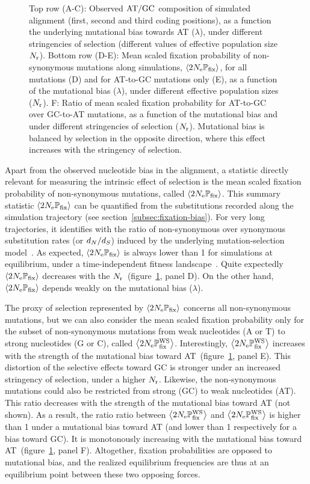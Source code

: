 \documentclass{article}
\begin{document}
\begin{figure}[h]
{  Top row (A-C): Observed $\text{AT/GC}$ composition of simulated alignment (first, second and third coding positions), as a function the underlying mutational bias towards AT ($\lambda$), under different stringencies of selection (different values of effective population size $N_{\text{r}}$).
  Bottom row (D-E): Mean scaled fixation probability of non-synonymous mutations along simulations, $\left\langle 2 N_{\text{e}} \mathbb{P}_{\text{fix}} \right\rangle$, for all mutations (D) and for AT-to-GC mutations only (E), as a function of the mutational bias ($\lambda$), under different effective population sizes ($N_{\text{r}}$).
  F: Ratio of mean scaled fixation probability for AT-to-GC over GC-to-AT mutations, as a function of the mutational bias and under different stringencies of selection ($N_{\text{r}}$).
  Mutational bias is balanced by selection in the opposite direction, where this effect increases with the stringency of selection.
 }
 \label{fig:simu-mut-bias}
\end{figure}

Apart from the observed nucleotide bias in the alignment, a statistic directly relevant for measuring the intrinsic effect of selection is the mean scaled fixation probability of {non-synonymous} mutations, called $\left\langle 2 N_{\text{e}} \mathbb{P}_{\text{fix}} \right\rangle$.
This summary statistic $\left\langle 2 N_{\text{e}} \mathbb{P}_{\text{fix}} \right\rangle$ can be quantified from the {substitutions} recorded along the simulation trajectory (see section~\ref{subsec:fixation-bias}).
For very long trajectories, it identifies with the ratio of {non-synonymous} over {synonymous} {substitution} rates (or $d_N / d_S$) induced by the underlying mutation-selection model~\citep{Spielman2015, DosReis2015, Jones2016}.
As expected, $\left\langle 2 N_{\text{e}} \mathbb{P}_{\text{fix}} \right\rangle$ is always lower than 1 for simulations at equilibrium, under a time-independent fitness landscape~\citep{Spielman2015}.
Quite expectedly $\left\langle 2 N_{\text{e}} \mathbb{P}_{\text{fix}} \right\rangle$ decreases with the $N_{\text{r}}$~(figure~\ref{fig:simu-mut-bias}, panel D).
On the other hand, $\left\langle 2 N_{\text{e}} \mathbb{P}_{\text{fix}} \right\rangle$ depends weakly on the mutational bias ($\lambda$).

The proxy of selection represented by $\left\langle 2 N_{\text{e}} \mathbb{P}_{\text{fix}} \right\rangle$ concerns all {non-synonymous} mutations, but we can also consider the mean scaled fixation probability only for the subset of {non-synonymous} mutations from weak nucleotides (A or T) to strong nucleotides (G or C), called $\left\langle 2 N_{\text{e}} \mathbb{P}_{\text{fix}}^{\text{WS}} \right\rangle$.
Interestingly, $\left\langle 2 N_{\text{e}} \mathbb{P}_{\text{fix}}^{\text{WS}} \right\rangle$ increases with the strength of the mutational bias toward AT~(figure~\ref{fig:simu-mut-bias}, panel E).
This distortion of the selective effects toward GC is stronger under an increased stringency of selection, under a higher $N_{\text{r}}$.
Likewise, the {non-synonymous} mutations could also be restricted from strong (GC) to weak nucleotides (AT).
This ratio decreases with the strength of the mutational bias toward AT (not shown).
As a result, the ratio ratio between $\left\langle 2 N_{\text{e}} \mathbb{P}_{\text{fix}}^{\text{WS}} \right\rangle$ and $\left\langle 2 N_{\text{e}} \mathbb{P}_{\text{fix}}^{\text{WS}} \right\rangle$ is higher than 1 under a mutational bias toward AT (and lower than 1 respectively for a bias toward GC).
It is monotonously increasing with the mutational bias toward AT~(figure~\ref{fig:simu-mut-bias}, panel F).
Altogether, fixation probabilities are opposed to mutational bias, and the realized equilibrium frequencies are thus at an equilibrium point between these two opposing forces.
\end{document}
